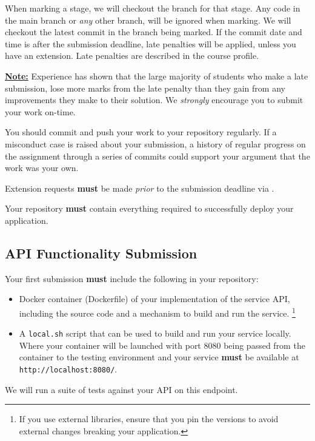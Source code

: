 \documentclass{csse4400}
\begin{document}
When marking a stage, we will checkout the branch for that stage.
Any code in the main branch or \textit{any} other branch, will be ignored when marking.
We will checkout the latest commit in the branch being marked.
If the commit date and time is after the submission deadline, late penalties will be applied,
unless you have an extension.
Late penalties are described in the course profile.

\textbf{\underline{Note:}} Experience has shown that the large majority of students who make a late submission,
lose more marks from the late penalty than they gain from any improvements they make to their solution.
We \textit{strongly} encourage you to submit your work on-time.

You should commit and push your work to your repository regularly.
If a misconduct case is raised about your submission,
a history of regular progress on the assignment through a series of commits
could support your argument that the work was your own.

Extension requests \textbf{must} be made \emph{prior} to the submission deadline via .

Your repository \textbf{must} contain everything required to successfully deploy your application.

\subsection{API Functionality Submission}
Your first submission \textbf{must} include the following in your repository:
\begin{itemize}
  \item Docker container (Dockerfile) of your implementation of the service API,
        including the source code and a mechanism to build and run the service.%
        \footnote{If you use external libraries,
                  ensure that you pin the versions to avoid external changes breaking your application.}
  \item A \texttt{local.sh} script that can be used to build and run your service locally.
        Where your container will be launched with port 8080 being passed from the container
        to the testing environment and your service \textbf{must} be available at \texttt{http://localhost:8080/}.
\end{itemize}
We will run a suite of tests against your API on this endpoint.
\end{document}
